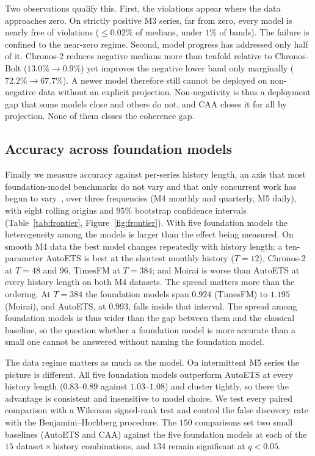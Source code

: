 \documentclass[review,number]{elsarticle}
\begin{document}
Two observations qualify this. First, the violations appear where the data
approaches zero. On strictly positive M3 series, far from zero, every model is
nearly free of violations ($\le 0.02\%$ of medians, under $1\%$ of bands). The failure
is confined to the near-zero regime. Second, model
progress has addressed only half of it. Chronos-2 reduces negative medians more than
tenfold relative to Chronos-Bolt ($13.0\%\to 0.9\%$) yet improves the
negative lower band only marginally ($72.2\%\to 67.7\%$). A newer model therefore still
cannot be
deployed on non-negative data without an explicit projection. Non-negativity is
thus a deployment gap that some models close and others do not, and CAA closes it for
all by projection. None of them closes the coherence gap.




\subsection{Accuracy across foundation models}
\label{sec:frontier}
Finally we measure accuracy against per-series history length, an axis that most
foundation-model benchmarks do not vary and that only concurrent work has begun to
vary~\citep{breakeven2026,quitobench2026,energyload2026}, over three frequencies (M4
monthly
and quarterly, M5 daily), with eight rolling origins and $95\%$ bootstrap confidence
intervals (Table~\ref{tab:frontier}, Figure~\ref{fig:frontier}). With five foundation
models the heterogeneity among the models is larger than the effect being
measured. On smooth M4 data the best model changes repeatedly with history length:
a ten-parameter AutoETS is best at the shortest monthly history ($T=12$), Chronos-2 at
$T=48$ and $96$, TimesFM at $T=384$; and Moirai is worse than AutoETS at every
history length on both M4 datasets. The spread matters more than the ordering. At
$T=384$ the foundation models span $0.924$ (TimesFM) to $1.195$ (Moirai), and AutoETS,
at $0.993$, falls inside that interval. The spread among foundation models is
thus wider than the gap between them and the classical baseline, so the question
whether a foundation model is more accurate than a small one cannot be answered
without naming the foundation model.

The data regime matters as much as the model. On intermittent M5 series the picture
is different. All five foundation models outperform AutoETS at every history
length ($0.83$--$0.89$ against $1.03$--$1.08$) and cluster tightly, so there the
advantage is consistent and insensitive to model choice. We test every paired
comparison with a Wilcoxon signed-rank test and control the false discovery rate with
the Benjamini--Hochberg procedure. The $150$ comparisons set two small baselines
(AutoETS and CAA) against the five foundation models at each of the $15$
dataset\,$\times$\,history combinations, and $134$ remain significant at $q<0.05$.
\end{document}
